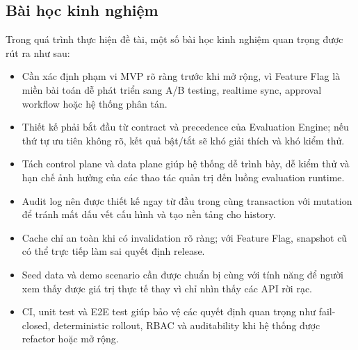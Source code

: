 \subsection{Bài học kinh nghiệm}

Trong quá trình thực hiện đề tài, một số bài học kinh nghiệm quan trọng được rút ra như sau:

\begin{itemize}
    \item Cần xác định phạm vi MVP rõ ràng trước khi mở rộng, vì Feature Flag là miền bài toán dễ phát triển sang A/B testing, realtime sync, approval workflow hoặc hệ thống phân tán.
    \item Thiết kế phải bắt đầu từ contract và precedence của Evaluation Engine; nếu thứ tự ưu tiên không rõ, kết quả bật/tắt sẽ khó giải thích và khó kiểm thử.
    \item Tách control plane và data plane giúp hệ thống dễ trình bày, dễ kiểm thử và hạn chế ảnh hưởng của các thao tác quản trị đến luồng evaluation runtime.
    \item Audit log nên được thiết kế ngay từ đầu trong cùng transaction với mutation để tránh mất dấu vết cấu hình và tạo nền tảng cho history.
    \item Cache chỉ an toàn khi có invalidation rõ ràng; với Feature Flag, snapshot cũ có thể trực tiếp làm sai quyết định release.
    \item Seed data và demo scenario cần được chuẩn bị cùng với tính năng để người xem thấy được giá trị thực tế thay vì chỉ nhìn thấy các API rời rạc.
    \item CI, unit test và E2E test giúp bảo vệ các quyết định quan trọng như fail-closed, deterministic rollout, RBAC và auditability khi hệ thống được refactor hoặc mở rộng.
\end{itemize}
